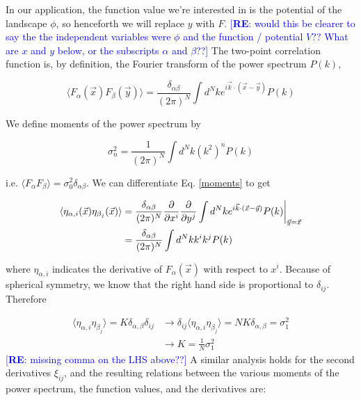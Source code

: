 \documentclass[12pt]{article}
\newcommand{\re}[1]{\textcolor{blue}{[{\bf RE}: #1]}}
\begin{document}
In our application, the function value we're interested in is the potential of the landscape $\phi$, so henceforth we will replace $y$ with $F$.  \re{would this be clearer to say the the independent variables were $\phi$ and the function / potential $V$?? What are $x$ and $y$ below, or the subscripts $\alpha$ and $\beta$??} The two-point correlation function is, by definition, the Fourier transform of the power spectrum $P(k)$,

\begin{equation}
\langle F_\alpha(\vec{x}) F_\beta(\vec{y}) \rangle = \frac{\delta_{\alpha\beta}}{(2\pi)^N} \int d^Nk e^{i \vec{k} \cdot (\vec{x}-\vec{y})} P(k)
\end{equation}

We define moments of the power spectrum by

\begin{equation} \label{moments}
\sigma_n^2 = \frac{1}{(2\pi)^N}\int d^Nk (k^{2})^n P(k)
\end{equation}

\noindent i.e. $\langle F_\alpha F_\beta \rangle = \sigma_0^2\delta_{\alpha\beta}$. We can differentiate Eq. \ref{moments} to get

\begin{align*}
\langle \eta_{\alpha,i}(\vec{x})\eta_{\beta_j}(\vec{x})\rangle &= \frac{\delta_{\alpha\beta}}{(2\pi)^N} \frac{\partial}{\partial x^i}\frac{\partial}{\partial y^j} \int d^Nk e^{i \vec{k} \cdot (\vec{x}-\vec{y})} P(k)\bigg{|}_{\vec{y}=\vec{x}}\\
&= \frac{\delta_{\alpha\beta}}{(2\pi)^N}\int d^Nk k^i k^j P(k)
\end{align*}

\noindent where $\eta_{\alpha, i}$ indicates the derivative of $F_\alpha(\vec{x})$ with respect to $x^i$. Because of spherical symmetry, we know that the right hand side is proportional to $\delta_{ij}$. Therefore

\begin{align*}
\langle \eta_{\alpha,i}\eta_{\beta_j}\rangle = K \delta_{\alpha,\beta}\delta_{ij} &\rightarrow \delta_{ij}\langle \eta_{\alpha,i}\eta_{\beta_j}\rangle = NK \delta_{\alpha,\beta}=\sigma_1^2\\
&\rightarrow K = \frac{1}{N}\sigma_1^2
\end{align*}
%
\re{missing comma on the LHS above??} A similar analysis holds for the second derivatives $\xi_{ij}$, and the resulting relations between the various moments of the power spectrum, the function values, and the derivatives are:
\end{document}
